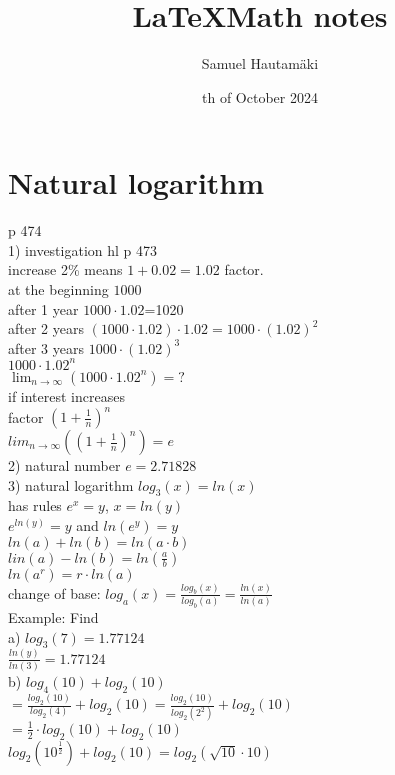 \documentclass{article}
\title{\LaTeX Math notes}
\author{Samuel Hautamäki}
\date{th of October 2024}
\begin{document}
  \maketitle
   
  \section{Natural logarithm}
  p 474\\
  1) investigation hl p 473\\
  increase 2\% means $1+0.02=1.02$ factor.\\
  at the beginning $1000$\\
  after 1 year $1000\cdot1.02$=1020\\
  after 2 years $(1000\cdot1.02)\cdot1.02=1000\cdot(1.02)^2$\\
  after 3 years $1000\cdot(1.02)^3$\\
  $1000\cdot1.02^n$\\
  $\lim_{n\to\infty}(1000\cdot1.02^n)=?$\\
  
  if interest increases\\
  factor $(1+\frac{1}{n})^n$\\
  $lim_{n\to\infty}((1+\frac{1}{n})^n)=e$\\
  2) natural number $e=2.71828$\\
  3) natural logarithm $log_3(x)=ln(x)$\\
  
  has rules $e^x=y$, $x=ln(y)$\\
  $e^{ln(y)}=y$ and $ln(e^y)=y$\\
  $ln(a)+ln(b)=ln(a\cdot b)$\\
  $lin(a)-ln(b)=ln(\frac{a}{b})$\\
  $ln(a^r)=r\cdot ln(a)$\\
  change of base: $log_a(x)=\frac{log_b(x)}{log_b(a)}=\frac{ln(x)}{ln(a)}$\\
  Example: Find\\
  a) $log_3(7)=1.77124$\\
  $\frac{ln(y)}{ln(3)}=1.77124$\\
  b) $log_4(10)+log_2(10)$\\
  $=\frac{log_2(10)}{log_2(4)}+log_2(10)=\frac{log_2(10)}{log_2(2^2)}+log_2(10)$\\
  $=\frac{1}{2}\cdot log_2(10)+log_2(10)$\\
  $log_2(10^{\frac{1}{2}})+log_2(10)=log_2(\sqrt{10}\cdot10)$\\
\end{document}
